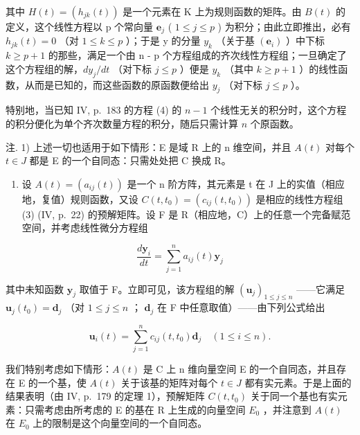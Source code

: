 其中 \(H(t) = \left(h_{jk}(t)\right)\) 是一个元素在 K 上为规则函数的矩阵。由 \(B(t)\) 的定义，这个线性方程以 p 个常向量 \(\mathbf{e}_{j}\) ( \(1 \leqslant j \leqslant p\) ) 为积分；由此立即推出，必有 \(h_{jk}(t) = 0\) （对 \(1 \leqslant k \leqslant p\) ）；于是 y 的分量 \(y_{k}\) （关于基 \((\mathbf{e}_{i})\) ）中下标 \(k \geqslant p + 1\) 的那些，满足一个由 n - p 个方程组成的齐次线性方程组；一旦确定了这个方程组的解，\(dy_{j}/dt\) （对下标 \(j \leqslant p\) ）便是 \(y_{k}\) （其中 \(k \geqslant p + 1\) ）的线性函数，从而是已知的，而这些函数的原函数便给出 \(y_{j}\) （对下标 \(j \leqslant p\) ）。

特别地，当已知 IV, p.~183 的方程 (4) 的 \(n - 1\) 个线性无关的积分时，这个方程的积分便化为单个齐次数量方程的积分，随后只需计算 \(n\) 个原函数。

注. 1) 上述一切也适用于如下情形：E 是域 R 上的 n 维空间，并且 \(A(t)\) 对每个 \(t \in J\) 都是 E 的一个自同态：只需处处把 C 换成 R。

\begin{enumerate}
\def\labelenumi{\arabic{enumi})}
\setcounter{enumi}{1}
\tightlist
\item
  设 \(A(t) = (a_{ij}(t))\) 是一个 n 阶方阵，其元素是 t 在 J 上的实值（相应地，复值）规则函数，又设 \(C(t, t_0) = (c_{ij}(t, t_0))\) 是相应的线性方程组 (3) (IV, p.~22) 的预解矩阵。设 F 是 R（相应地，C）上的任意一个完备赋范空间，并考虑线性微分方程组
\end{enumerate}

\[
\frac {d \mathbf {y} _ {i}}{d t} = \sum_ {j = 1} ^ {n} a _ {i j} (t) \mathbf {y} _ {j}
\]

其中未知函数 \(\mathbf{y}_j\) 取值于 F。立即可见，该方程组的解 \((\mathbf{u}_j)_{1\leqslant j\leqslant n}\) ——它满足 \(\mathbf{u}_j(t_0) = \mathbf{d}_j\) （对 \(1\leqslant j\leqslant n\) ； \(\mathbf{d}_j\) 在 F 中任意取值）——由下列公式给出

\[
\mathbf {u} _ {i} (t) = \sum_ {j = 1} ^ {n} c _ {i j} (t, t _ {0}) \mathbf {d} _ {j} \quad (1 \leqslant i \leqslant n).
\]

我们特别考虑如下情形：\(A(t)\) 是 C 上 n 维向量空间 E 的一个自同态，并且存在 E 的一个基，使 \(A(t)\) 关于该基的矩阵对每个 \(t \in J\) 都有实元素。于是上面的结果表明（由 IV, p.~179 的定理 1），预解矩阵 \(C(t, t_{0})\) 关于同一个基也有实元素：只需考虑由所考虑的 E 的基在 R 上生成的向量空间 \(E_{0}\) ，并注意到 \(A(t)\) 在 \(E_{0}\) 上的限制是这个向量空间的一个自同态。

